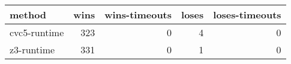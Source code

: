 \begin{tabular}{lrrrr}
\hline
 method       &   wins &   wins-timeouts &   loses &   loses-timeouts \\
\hline
 cvc5-runtime &    323 &               0 &       4 &                0 \\
 z3-runtime   &    331 &               0 &       1 &                0 \\
\hline
\end{tabular}

